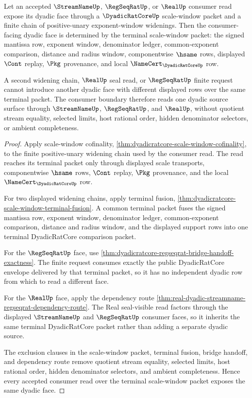 \begin{theorem}
\label{thm:dyadicratcore-scale-window-consumer-face-determinacy}
Let an accepted $\StreamNameUp$, $\RegSeqRatUp$, or $\RealUp$ consumer read expose its dyadic face through a $\DyadicRatCoreUp$ scale-window packet and a finite chain of positive-unary exponent-window widenings. Then the consumer-facing dyadic face is determined by the terminal scale-window packet: the signed mantissa row, exponent window, denominator ledger, common-exponent comparison, distance and radius window, componentwise $\hsame$ rows, displayed $\Cont$ replay, $\Pkg$ provenance, and local $\NameCert_{\DyadicRatCoreUp}$ row.

A second widening chain, $\RealUp$ seal read, or $\RegSeqRatUp$ finite request cannot introduce another dyadic face with different displayed rows over the same terminal packet. The consumer boundary therefore reads one dyadic source surface through $\StreamNameUp$, $\RegSeqRatUp$, and $\RealUp$, without quotient stream equality, selected limits, host rational order, hidden denominator selectors, or ambient completeness.
\end{theorem}
\begin{proof}
Apply scale-window cofinality, \autoref{thm:dyadicratcore-scale-window-cofinality}, to the finite positive-unary widening chain used by the consumer read. The read reaches its terminal packet only through displayed scale transports, componentwise $\hsame$ rows, $\Cont$ replay, $\Pkg$ provenance, and the local $\NameCert_{\DyadicRatCoreUp}$ row.

For two displayed widening chains, apply terminal fusion, \autoref{thm:dyadicratcore-scale-window-terminal-fusion}. A common terminal packet fuses the signed mantissa row, exponent window, denominator ledger, common-exponent comparison, distance and radius window, and the displayed support rows into one terminal DyadicRatCore comparison packet.

For the $\RegSeqRatUp$ face, use \autoref{thm:dyadicratcore-regseqrat-bridge-handoff-exactness}. The finite request consumes exactly the public DyadicRatCore envelope delivered by that terminal packet, so it has no independent dyadic row from which to read a different face.

For the $\RealUp$ face, apply the dependency route \autoref{thm:real-dyadic-streamname-regseqrat-dependency-route}. The Real seal-visible read factors through the displayed $\StreamNameUp$ and $\RegSeqRatUp$ consumer faces, so it inherits the same terminal DyadicRatCore packet rather than adding a separate dyadic source.

The exclusion clauses in the scale-window packet, terminal fusion, bridge handoff, and dependency route remove quotient stream equality, selected limits, host rational order, hidden denominator selectors, and ambient completeness. Hence every accepted consumer read over the terminal scale-window packet exposes the same dyadic face.
\end{proof}

